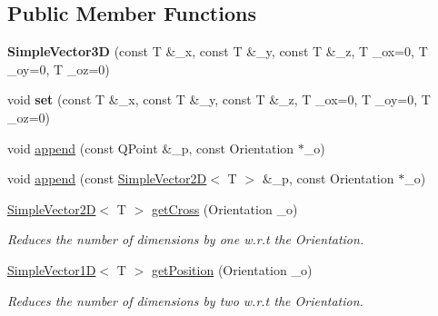 \subsection*{Public Member Functions}
\begin{DoxyCompactItemize}
\item 
\mbox{\label{classViewer_1_1SimpleVector3D_a1eef4e84e879f41f7728b9c56bac0be8}} 
{\bfseries Simple\+Vector3D} (const T \&\+\_\+x, const T \&\+\_\+y, const T \&\+\_\+z, T \+\_\+ox=0, T \+\_\+oy=0, T \+\_\+oz=0)
\item 
\mbox{\label{classViewer_1_1SimpleVector3D_afb1b1a17d5b9c51d0c7ce7e0fcae138e}} 
void {\bfseries set} (const T \&\+\_\+x, const T \&\+\_\+y, const T \&\+\_\+z, T \+\_\+ox=0, T \+\_\+oy=0, T \+\_\+oz=0)
\item 
void \mbox{\hyperlink{classViewer_1_1SimpleVector3D_a124240f41e6e79f30079e9403d1ba75f}{append}} (const Q\+Point \&\+\_\+p, const Orientation $\ast$\+\_\+o)
\item 
void \mbox{\hyperlink{classViewer_1_1SimpleVector3D_af4c356b63832388d9f3a7f6329692ad1}{append}} (const \mbox{\hyperlink{classViewer_1_1SimpleVector2D}{Simple\+Vector2D}}$<$ T $>$ \&\+\_\+p, const Orientation $\ast$\+\_\+o)
\item 
\mbox{\label{classViewer_1_1SimpleVector3D_a16d6e68bd050c824b88fdb7ffe064225}} 
\mbox{\hyperlink{classViewer_1_1SimpleVector2D}{Simple\+Vector2D}}$<$ T $>$ \mbox{\hyperlink{classViewer_1_1SimpleVector3D_a16d6e68bd050c824b88fdb7ffe064225}{get\+Cross}} (Orientation \+\_\+o)
\begin{DoxyCompactList}\small\item\em Reduces the number of dimensions by one w.\+r.\+t the Orientation. \end{DoxyCompactList}\item 
\mbox{\label{classViewer_1_1SimpleVector3D_a32c0cbb4c6e62c4f06c1dbfaa6b2c903}} 
\mbox{\hyperlink{classViewer_1_1SimpleVector1D}{Simple\+Vector1D}}$<$ T $>$ \mbox{\hyperlink{classViewer_1_1SimpleVector3D_a32c0cbb4c6e62c4f06c1dbfaa6b2c903}{get\+Position}} (Orientation \+\_\+o)
\begin{DoxyCompactList}\small\item\em Reduces the number of dimensions by two w.\+r.\+t the Orientation. \end{DoxyCompactList}\item 

\end{DoxyCompactItemize}
